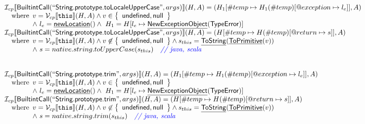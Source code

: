\documentclass{article}
\makeatletter
\newcommand{\SF}[1]{\mbox{\textsf{#1}}}
\newcommand{\TT}[1]{\mbox{\texttt{#1}}}
\newcommand{\comment}[1]{\textit{#1}}
\newcommand{\wherec}[1]{{\rm where}\begin{array}[t]{l}#1\end{array}}
\newcommand{\I}{\mathcal{I}}
\newcommand{\V}{\mathcal{V}}
\newcommand{\set}[1]{\left\{\begin{array}{l}#1\end{array}\right\}}
\newcommand{\lbr}{\llbracket}
\newcommand{\rbr}{\rrbracket}
\newcommand{\hf}[1]{\underline{\sf #1}}
\newcommand{\varloc}[1]{\##1}
\newcommand{\varprop}[1]{@#1}
\def\inblue{\color{blue}}
\def\inblue{\color{blue}}
\makeatother
\begin{document}
\[\begin{array}{l}
  
\I _{cp}\lbr \SF{BuiltintCall}(``\SF{String.prototype.toLocaleUpperCase}",args)\rbr(H,A)
 = (H_1[\varloc{temp}\mapsto H_1(\varloc{temp})[\varprop{exception}\mapsto l_e]], A) \\
\quad\wherec{
  v = \V _{cp}\lbr \TT{this}\rbr (H,A) \land v \in \set{\SF{undefined}, \SF{null}}\\
  \land\ l_e = \hf{newLocation}() \land\ H_1=H[l_e\mapsto\hf{NewExceptionObject}(\SF{TypeError})] 
  }\\
  
\I _{cp}\lbr \SF{BuiltintCall}(``\SF{String.prototype.toLocaleUpperCase}",args)\rbr(H,A)
 = (H[\varloc{temp}\mapsto H(\varloc{temp})[\varprop{return}\mapsto s]], A) \\
\quad\wherec{
  v = \V _{cp}\lbr \TT{this}\rbr (H,A) \land v \not\in \set{\SF{undefined}, \SF{null}}
  \land s_{this} = \hf{ToString}(\hf{ToPrimitive}(v))\\
  \land\ s = native.string.toUpperCase(s_{this}) \quad\comment{{\inblue // java, scala}}\\
  }\\
\\\\



\I _{cp}\lbr \SF{BuiltintCall}(``\SF{String.prototype.trim}",args)\rbr(H,A)
 = (H_1[\varloc{temp}\mapsto H_1(\varloc{temp})[\varprop{exception}\mapsto l_e]], A) \\
\quad\wherec{
  v = \V _{cp}\lbr \TT{this}\rbr (H,A) \land v \in \set{\SF{undefined}, \SF{null}}\\
  \land\ l_e = \hf{newLocation}() \land\ H_1=H[l_e\mapsto\hf{NewExceptionObject}(\SF{TypeError})] 
  }\\
  
\I _{cp}\lbr \SF{BuiltintCall}(``\SF{String.prototype.trim}",args)\rbr(H,A)
 = (H[\varloc{temp}\mapsto H(\varloc{temp})[\varprop{return}\mapsto s]], A) \\
\quad\wherec{
  v = \V _{cp}\lbr \TT{this}\rbr (H,A) \land v \not\in \set{\SF{undefined}, \SF{null}}
  \land s_{this} = \hf{ToString}(\hf{ToPrimitive}(v))\\
  \land\ s = native.string.trim(s_{this}) \quad\comment{{\inblue // java, scala}}\\
  }\\
\\\\
\end{array}
\]
\end{document}
